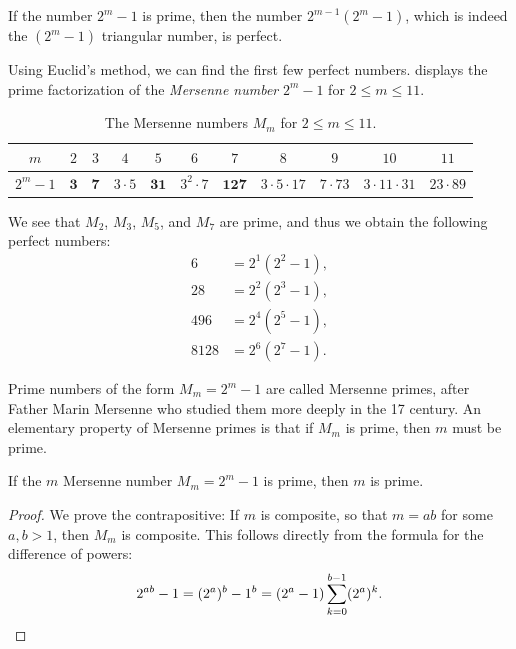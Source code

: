\begin{proposition}[Euclid]
  If the number $2^m-1$ is prime, then the number $2^{m-1}(2^m-1)$, which is indeed the $(2^m-1)$\supth{} triangular number, is perfect.
\end{proposition}

Using Euclid's method, we can find the first few perfect numbers.  displays the prime factorization of the \emph{Mersenne number} $2^m-1$ for $2\leq m\leq 11$.

\begin{table}[H]
  \centering
  \begin{tabular}{c|cccccccccc}
    $m$ & $2$ & $3$ & $4$ & $5$ & $6$ & $7$ & $8$ & $9$ & $10$ & $11$ \\
    \midrule
    $2^m-1$ & $\symbf{3}$ & $\symbf{7}$ & $3\cdot 5$ & $\symbf{31}$ & $3^2\cdot 7$ & $\symbf{127}$ & $3\cdot 5\cdot 17$ & $7\cdot 73$ & $3\cdot 11\cdot 31$ & $23\cdot 89$
  \end{tabular}
  \caption[The first few Mersenne numbers]{The Mersenne numbers $M_m$ for $2\leq m\leq 11$.}
  \label{tab:mersenne-numbers}
\end{table}

We see that $M_2$, $M_3$, $M_5$, and $M_7$ are prime, and thus we obtain the following perfect numbers:
\begin{align*}
  6 & = 2^1(2^2-1), \\
  28 & = 2^2(2^3-1), \\
  496 & = 2^4(2^5-1), \\
  8128 & = 2^6(2^7-1).
\end{align*}

Prime numbers of the form $M_m=2^m-1$ are called Mersenne primes, after Father Marin Mersenne who studied them more deeply in the 17\supth{} century. An elementary property of Mersenne primes is that if $M_m$ is prime, then $m$ must be prime.

\begin{proposition}
  If the $m$\supth{} Mersenne number $M_m=2^m-1$ is prime, then $m$ is prime.
\end{proposition}

\begin{proof}
  We prove the contrapositive: If $m$ is composite, so that $m=ab$ for some $a,b>1$, then $M_m$ is composite. This follows directly from the formula for the difference of powers:
  \begin{equation*}
    2^{ab}-1=(2^a)^b-1^b= (2^a-1)\sum_{k=0}^{b-1} (2^a)^k.\qedhere
  \end{equation*}
\end{proof}

